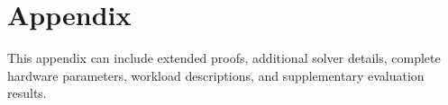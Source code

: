 \section{Appendix}
\label{sec:appendix}

This appendix can include extended proofs, additional solver details, complete hardware parameters, workload descriptions, and supplementary evaluation results.
